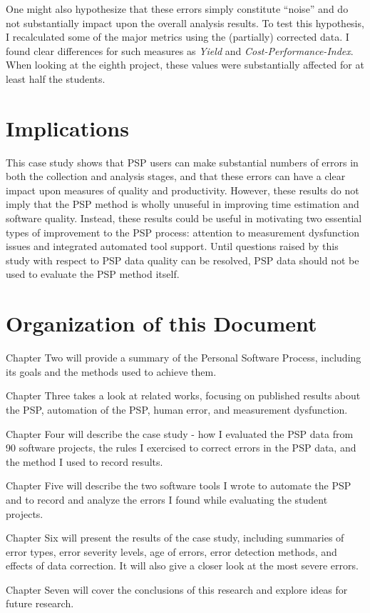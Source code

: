 One might also hypothesize that these errors simply constitute ``noise''
and do not substantially impact upon the overall analysis results.  To test
this hypothesis, I recalculated some of the major metrics using the
(partially) corrected data.  I found clear differences for such measures
as {\it Yield} and {\it Cost-Performance-Index}.  When looking at the
eighth project, these values were substantially affected for at least half
the students.

\section{Implications}

This case study shows that PSP users can make substantial numbers of errors
in both the collection and analysis stages, and that these errors can have
a clear impact upon measures of quality and productivity.  However, these
results do not imply that the PSP method is wholly unuseful in improving
time estimation and software quality. Instead, these results could be
useful in motivating two essential types of improvement to the PSP process:
attention to measurement dysfunction issues and integrated automated tool
support.  Until questions raised by this study with respect to PSP data
quality can be resolved, PSP data should not be used to evaluate the PSP
method itself.  

\section{Organization of this Document}

Chapter Two will provide a summary of the Personal Software Process,
including its goals and the methods used to achieve them.

Chapter Three takes a look at related works, focusing on published results
about the PSP, automation of the PSP, human error, and measurement 
dysfunction.

Chapter Four will describe the case study - how I evaluated the PSP data
from 90 software projects, the rules I exercised to correct errors in the
PSP data, and the method I used to record results.

Chapter Five will describe the two software tools I wrote to automate the PSP
and to record and analyze the errors I found while evaluating the student
projects.

Chapter Six will present the results of the case study, including
summaries of error types, error severity levels, age of errors, error
detection methods, and effects of data correction.  It will also give a 
closer look at the most severe errors.

Chapter Seven will cover the conclusions of this research and explore
ideas for future research.




